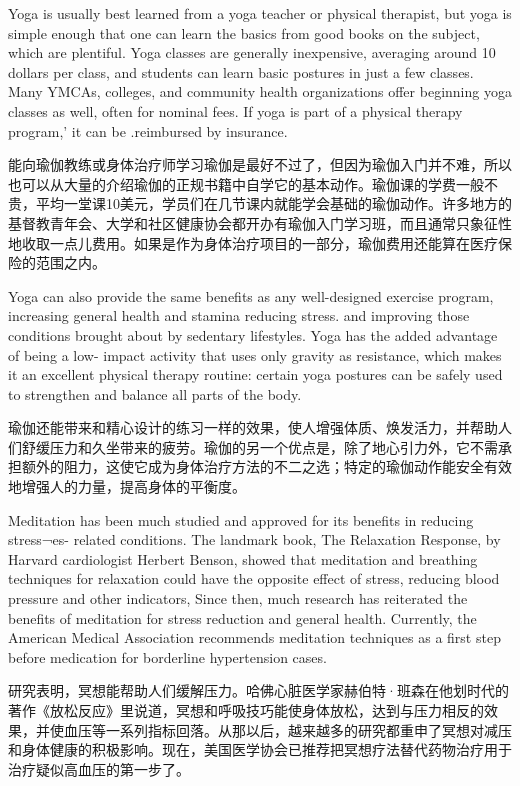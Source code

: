 \documentclass[cs4size, a4paper,12pt]{article}
\newcounter{numpar}
\newcommand*{\newpar}{\numpar{}}
\begin{document}
\newpar Yoga is usually best learned from a yoga teacher or physical therapist, but yoga is simple enough that one can learn the basics from good books on the subject, which are plentiful. Yoga classes are generally inexpensive, averaging around 10 dollars per class, and students can learn basic postures in just a few classes. Many YMCAs, colleges, and community health organizations offer beginning yoga classes as well, often for nominal fees. If yoga is part of a physical therapy program,' it can be .reimbursed by insurance.

能向瑜伽教练或身体治疗师学习瑜伽是最好不过了，但因为瑜伽入门并不难，所以也可以从大量的介绍瑜伽的正规书籍中自学它的基本动作。瑜伽课的学费一般不贵，平均一堂课10美元，学员们在几节课内就能学会基础的瑜伽动作。许多地方的基督教青年会、大学和社区健康协会都开办有瑜伽入门学习班，而且通常只象征性地收取一点儿费用。如果是作为身体治疗项目的一部分，瑜伽费用还能算在医疗保险的范围之内。

\newpar Yoga can also provide the same benefits as any well-designed exercise program, increasing general health and stamina reducing stress. and improving those conditions brought about by sedentary lifestyles. Yoga has the added advantage of being a low- impact activity that uses only gravity as resistance, which makes it an excellent physical therapy routine: certain yoga postures can be safely used to strengthen and balance all
parts of the body.

瑜伽还能带来和精心设计的练习一样的效果，使人增强体质、焕发活力，并帮助人们舒缓压力和久坐带来的疲劳。瑜伽的另一个优点是，除了地心引力外，它不需承担额外的阻力，这使它成为身体治疗方法的不二之选；特定的瑜伽动作能安全有效地增强人的力量，提高身体的平衡度。

\newpar Meditation has been much studied and approved for its benefits in reducing stress¬es- related conditions. The landmark book, The Relaxation Response, by Harvard cardiologist Herbert Benson, showed that meditation and breathing techniques for relaxation could have the opposite effect of stress, reducing blood pressure and other indicators, Since then, much research has reiterated the benefits of meditation for stress reduction and general health. Currently, the American Medical Association recommends meditation techniques as a first step before medication for borderline hypertension cases.

研究表明，冥想能帮助人们缓解压力。哈佛心脏医学家赫伯特·班森在他划时代的著作《放松反应》里说道，冥想和呼吸技巧能使身体放松，达到与压力相反的效果，并使血压等一系列指标回落。从那以后，越来越多的研究都重申了冥想对减压和身体健康的积极影响。现在，美国医学协会已推荐把冥想疗法替代药物治疗用于治疗疑似高血压的第一步了。
\end{document}
